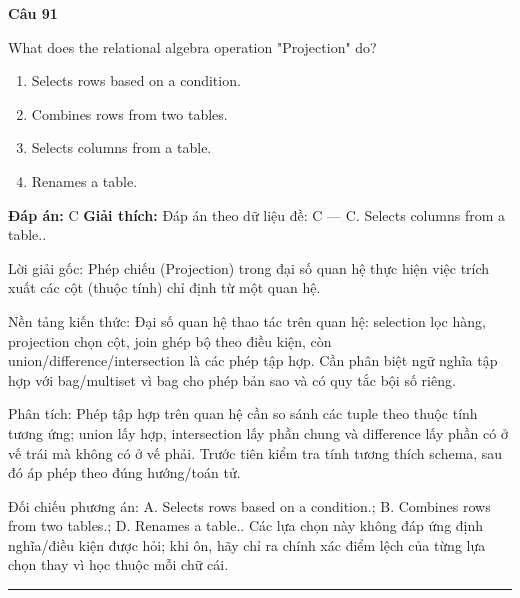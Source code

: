 \documentclass[11pt,a4paper]{article}
\newenvironment{question}[1]{%
  \par\vspace{1em}\noindent\textbf{\large Câu #1}\par\vspace{0.4em}
}{%
  \par\vspace{1em}\hrule\vspace{0.6em}
}
\newenvironment{choices}{%
  \begin{enumerate}[label=\textbf{\Alph*.},leftmargin=2.2em,itemsep=2pt,topsep=3pt]
}{%
  \end{enumerate}
}
\newcommand{\choice}{\item}
\begin{document}
\begin{question}{91}
What does the relational algebra operation "Projection" do?
\begin{choices}
\choice Selects rows based on a condition.
\choice Combines rows from two tables.
\choice Selects columns from a table.
\choice Renames a table.
\end{choices}
\textbf{Đáp án:} C
\textbf{Giải thích:} Đáp án theo dữ liệu đề: C — C. Selects columns from a table..

Lời giải gốc: Phép chiếu (Projection) trong đại số quan hệ thực hiện việc trích xuất các cột (thuộc tính) chỉ định từ một quan hệ.

Nền tảng kiến thức: Đại số quan hệ thao tác trên quan hệ: selection lọc hàng, projection chọn cột, join ghép bộ theo điều kiện, còn union/difference/intersection là các phép tập hợp. Cần phân biệt ngữ nghĩa tập hợp với bag/multiset vì bag cho phép bản sao và có quy tắc bội số riêng.

Phân tích: Phép tập hợp trên quan hệ cần so sánh các tuple theo thuộc tính tương ứng; union lấy hợp, intersection lấy phần chung và difference lấy phần có ở vế trái mà không có ở vế phải. Trước tiên kiểm tra tính tương thích schema, sau đó áp phép theo đúng hướng/toán tử.

Đối chiếu phương án: A. Selects rows based on a condition.; B. Combines rows from two tables.; D. Renames a table.. Các lựa chọn này không đáp ứng định nghĩa/điều kiện được hỏi; khi ôn, hãy chỉ ra chính xác điểm lệch của từng lựa chọn thay vì học thuộc mỗi chữ cái.
\end{question}
\end{document}
